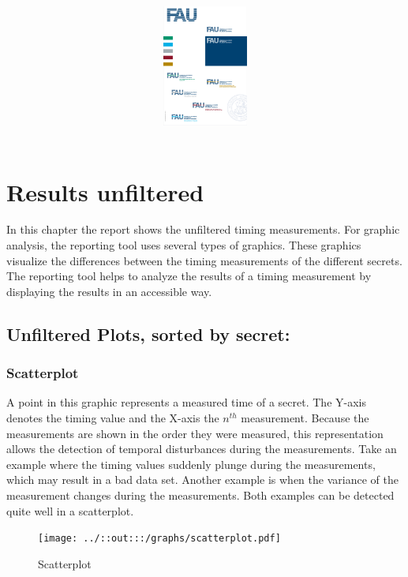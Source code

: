 \documentclass[
    oneside,        
    12pt
    ]{scrbook}
\begin{document}
\pagestyle{empty} %


\title{\textsc{\fontsize{18pt}{12pt}\linespread {1.7}}
				 \vspace{4cm}
         \hspace{1cm}
         \vspace{2cm}
         \includegraphics[height=4cm]{../../unilogo.pdf}
         \author{}
}

\maketitle

\tableofcontents            %
\listoffigures 							%


\pagestyle{fancy} %

\chapter{Results unfiltered}\label{chapter1}
In this chapter the report shows the unfiltered timing measurements. For graphic analysis, the reporting tool uses several types of graphics. These graphics visualize the differences between the timing measurements of the different secrets. The reporting tool helps to analyze the results of a timing measurement by displaying the results in an accessible way. 

\section{Unfiltered Plots, sorted by secret:}\label{section11}
\subsection{Scatterplot}\label{subsection1}
A point in this graphic represents a measured time of a secret. The Y-axis denotes the timing value and the X-axis the $n^{th}$ measurement. Because the measurements are shown in the order they were measured, this representation allows the detection of temporal disturbances during the measurements. Take an example where the timing values suddenly plunge during the measurements, which may result in a bad data set. Another example is when the variance of the measurement changes during the measurements. Both examples can be detected quite well in a scatterplot. \newline
	\begin{figure}[ht]
	\texttt{[image: ../::out:::/graphs/scatterplot.pdf]}
	\caption[Results unfiltered: Scatterplot.]{Scatterplot}
  \label{fig:scatterplot}
	\end{figure}
	\newpage
\end{document}

